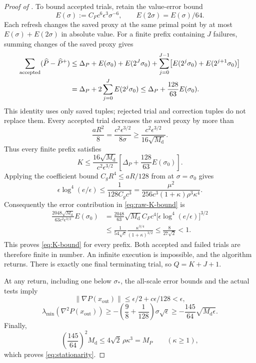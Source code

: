 \documentclass[11pt]{article}
\numberwithin{equation}{section}
\newcommand{\eps}{\epsilon}
\newcommand{\norm}[1]{\left\lVert#1\right\rVert}
\newcommand{\Md}{M_{\mathrm d}}
\newcommand{\MP}{M_P}
\begin{document}
\begin{proof}[Proof of ]
To bound accepted trials, retain the value-error bound
\begin{equation}\label{eq:E-definition}
 E(\sigma):=C_Fc^6\eps^3\sigma^{-6},
 \qquad E(2\sigma)=E(\sigma)/64.
\end{equation}
Each refresh changes the saved proxy at the same primal point by
at most $E(\sigma)+E(2\sigma)$ in absolute value.
For a finite prefix containing $J$ failures, summing changes of the
saved proxy gives
\begin{align}
 \sum_{\mathrm{accepted}}(\widehat P-\widehat P^+)
 &\le\Delta_P+E(\sigma_0)+E(2^J\sigma_0)
       +\sum_{j=0}^{J-1}\bigl[E(2^j\sigma_0)+E(2^{j+1}\sigma_0)\bigr]
       \notag\\
 &=\Delta_P+2\sum_{j=0}^JE(2^j\sigma_0)
 \le\Delta_P+\frac{128}{63}E(\sigma_0).
 \label{eq:proxy-budget}
\end{align}
This identity uses only saved tuples; rejected trial and correction
tuples do not replace them.
Every accepted trial decreases the saved proxy by more than
\[
 \frac{aR^2}{8}
 =\frac{c^2\eps^{3/2}}{8\sigma}
 \ge\frac{c^2\eps^{3/2}}{16\sqrt{\Md}}.
\]
Thus every finite prefix satisfies
\begin{equation}\label{eq:raw-K-bound}
 K\le\frac{16\sqrt{\Md}}{c^2\eps^{3/2}}
       \left[\Delta_P+\frac{128}{63}E(\sigma_0)\right].
\end{equation}
Applying the coefficient bound $C_gR^4\le aR/128$
from  at $\sigma=\sigma_0$ gives
\[
 \eps\log^4(e/\eps)
 \le\frac1{128C_gc^3}
 =\frac{\mu^2}{256c^3(1+\kappa)\rho^3\kappa^4}.
\]
Consequently the error contribution in \eqref{eq:raw-K-bound} is
\begin{align*}
 \frac{2048\sqrt{\Md}}{63c^2\eps^{3/2}}E(\sigma_0)
 &=\frac{2048}{63}\sqrt{\Md}C_Fc^4
             \bigl[\eps\log^4(e/\eps)\bigr]^{3/2}\\
 &\le\frac1{54\sqrt c}
             \frac{\kappa^{3/4}}{(1+\kappa)^{3/2}}
 \le\frac8{27\sqrt2}<1.
\end{align*}
This proves \eqref{eq:K-bound} for every prefix.
Both accepted and failed trials are therefore finite in number.
An infinite execution is impossible, and the algorithm returns.
There is exactly one final terminating trial, so $Q=K+J+1$.

At any return, including one below $\sigma_*$, the all-scale error
bounds and the actual tests imply
\[
 \norm{\nabla P(x_{\mathrm{out}})}
 \le\eps/2+c\eps/128<\eps,
\]
\[
 \lambda_{\min}(\nabla^2P(x_{\mathrm{out}}))
 \ge-\left(\frac98+\frac1{128}\right)\sigma\sqrt\eps
 \ge-\frac{145}{64}\sqrt{\Md\eps}.
\]
Finally,
\[
 \left(\frac{145}{64}\right)^2\Md
 \le4\sqrt2\,\rho\kappa^3=\MP
 \qquad(\kappa\ge1),
\]
which proves \eqref{eq:stationarity}.


\end{proof}
\end{document}
